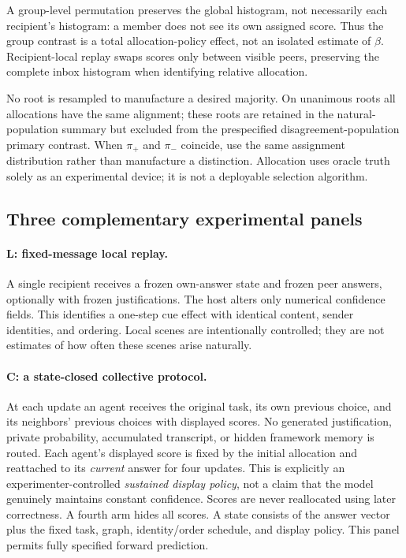 \documentclass[11pt]{article}
\begin{document}
A group-level permutation preserves the global histogram, not necessarily each recipient's histogram: a member does not see its own assigned score. Thus the group contrast is a total allocation-policy effect, not an isolated estimate of $\beta$. Recipient-local replay swaps scores only between visible peers, preserving the complete inbox histogram when identifying relative allocation.

No root is resampled to manufacture a desired majority. On unanimous roots all allocations have the same alignment; these roots are retained in the natural-population summary but excluded from the prespecified disagreement-population primary contrast. When $\pi_+$ and $\pi_-$ coincide, use the same assignment distribution rather than manufacture a distinction. Allocation uses oracle truth solely as an experimental device; it is not a deployable selection algorithm.

\subsection{Three complementary experimental panels}
\label{sec:panels}
\paragraph{L: fixed-message local replay.}
A single recipient receives a frozen own-answer state and frozen peer answers, optionally with frozen justifications. The host alters only numerical confidence fields. This identifies a one-step cue effect with identical content, sender identities, and ordering. Local scenes are intentionally controlled; they are not estimates of how often these scenes arise naturally.

\paragraph{C: a state-closed collective protocol.}
At each update an agent receives the original task, its own previous choice, and its neighbors' previous choices with displayed scores. No generated justification, private probability, accumulated transcript, or hidden framework memory is routed. Each agent's displayed score is fixed by the initial allocation and reattached to its \emph{current} answer for four updates. This is explicitly an experimenter-controlled \emph{sustained display policy}, not a claim that the model genuinely maintains constant confidence. Scores are never reallocated using later correctness. A fourth arm hides all scores. A state consists of the answer vector plus the fixed task, graph, identity/order schedule, and display policy. This panel permits fully specified forward prediction.
\end{document}
